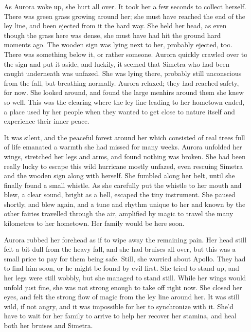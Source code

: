\fancybreaker{}

As Aurora woke up, she hurt all over. It took her a few seconds to collect herself. There was green grass growing around her; she must have reached the end of the ley line, and been ejected from it the hard way. She held her head, as even though the grass here was dense, she must have had hit the ground hard moments ago. The wooden sign was lying next to her, probably ejected, too. There was something below it, or rather someone. Aurora quickly crawled over to the sign and put it aside, and luckily, it seemed that Simetra who had been caught underneath was unfazed. She was lying there, probably still unconscious from the fall, but breathing normally. Aurora relaxed; they had reached safety, for now. She looked around, and found the large menhirs around them she knew so well. This was the clearing where the ley line leading to her hometown ended, a place used by her people when they wanted to get close to nature itself and experience their inner peace.

It was silent, and the peaceful forest around her which consisted of real trees full of life emanated a warmth she had missed for many weeks. Aurora unfolded her wings, stretched her legs and arms, and found nothing was broken. She had been really lucky to escape this wild hurricane mostly unfazed, even rescuing Simetra and the wooden sign along with herself. She fumbled along her belt, until she finally found a small whistle. As she carefully put the whistle to her mouth and blew, a clear sound, bright as a bell, escaped the tiny instrument. She paused shortly, and blew again, and a tune and rhythm unique to her and known by the other fairies travelled through the air, amplified by magic to travel the many kilometres to her hometown. Her family would be here soon.

Aurora rubbed her forehead as if to wipe away the remaining pain. Her head still felt a bit dull from the heavy fall, and she had bruises all over, but this was a small price to pay for them being safe. Still, she worried about Apollo. They had to find him soon, or he might be found by evil first. She tried to stand up, and her legs were still wobbly, but she managed to stand still. While her wings would unfold just fine, she was not strong enough to take off right now. She closed her eyes, and felt the strong flow of magic from the ley line around her. It was still wild, if not angry, and it was impossible for her to synchronize with it. She'd have to wait for her family to arrive to help her recover her stamina, and heal both her bruises and Simetra.

